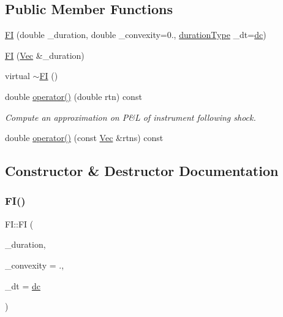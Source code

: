 \subsection*{Public Member Functions}
\begin{DoxyCompactItemize}
\item 
\hyperlink{classFI_a8caa07473802c6c7dd10cc1c98af7397}{FI} (double \+\_\+duration, double \+\_\+convexity=0., \hyperlink{instrument_8h_aeef2cd5bd2753709d5c6348c32cbdaa0}{duration\+Type} \+\_\+dt=\hyperlink{instrument_8h_aeef2cd5bd2753709d5c6348c32cbdaa0a22e2e72997ac4289587cadae38cc561e}{dc})
\item 
\hyperlink{classFI_a52951d4aeccbe628a59b65968713c85f}{FI} (\hyperlink{compute__returns__eigen_8h_a1eb6a9306ef406d7975f3cbf2e247777}{Vec} \&\+\_\+duration)
\item 
virtual \hyperlink{classFI_a856ac31d9840ae7cd9eeba9482832f8a}{$\sim$\+FI} ()
\item 
double \hyperlink{classFI_a99ad4380e8178d7fd304597622a2c05c}{operator()} (double rtn) const
\begin{DoxyCompactList}\small\item\em Compute an approximation on P\&L of instrument following shock. \end{DoxyCompactList}\item 
double \hyperlink{classFI_ab50033a007000c4b4c65a5a5bc08433d}{operator()} (const \hyperlink{compute__returns__eigen_8h_a1eb6a9306ef406d7975f3cbf2e247777}{Vec} \&rtns) const
\end{DoxyCompactItemize}


\subsection{Constructor \& Destructor Documentation}
\hypertarget{classFI_a8caa07473802c6c7dd10cc1c98af7397}{}\label{classFI_a8caa07473802c6c7dd10cc1c98af7397} 
\subsubsection{\texorpdfstring{F\+I()}{FI()}\hspace{0.1cm}{\footnotesize\ttfamily [1/2]}}
{\footnotesize\ttfamily F\+I\+::\+FI (\begin{DoxyParamCaption}\item[{double}]{\+\_\+duration,  }\item[{double}]{\+\_\+convexity = {.},  }\item[{\hyperlink{instrument_8h_aeef2cd5bd2753709d5c6348c32cbdaa0}{duration\+Type}}]{\+\_\+dt = {\ttfamily \hyperlink{instrument_8h_aeef2cd5bd2753709d5c6348c32cbdaa0a22e2e72997ac4289587cadae38cc561e}{dc}} }\end{DoxyParamCaption})}

